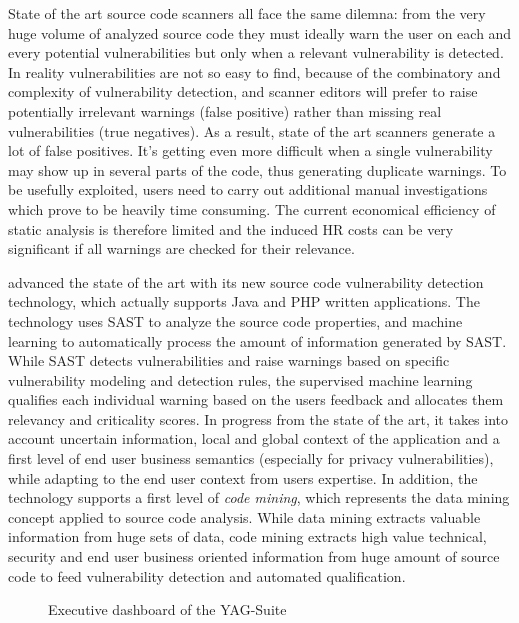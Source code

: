 \documentclass[a4paper,11pt]{article}
\begin{document}
State of the art source code scanners all face the same dilemna: from the very huge volume of analyzed source code they must ideally warn the user on each and every potential vulnerabilities but only when a relevant vulnerability is detected. In reality vulnerabilities are not so easy to find, because of the combinatory and complexity of vulnerability detection, and scanner editors will prefer to raise potentially irrelevant warnings (false positive) rather than missing real vulnerabilities (true negatives). As a result, state of the art scanners generate a lot of false positives. It's getting even more difficult when a single vulnerability may show up in several parts of the code, thus generating duplicate warnings. 
To be usefully exploited, users need to carry out additional manual investigations which prove to be heavily time consuming. The current economical efficiency of static analysis is therefore limited and the induced HR costs can be very significant if all warnings are checked for their relevance.

\YAGshort{} advanced the state of the art with its new source code vulnerability detection technology, which actually supports Java and PHP written applications. The technology uses SAST to analyze the source code properties, and machine learning to automatically process the amount of information generated by SAST. While SAST detects vulnerabilities and raise warnings based on specific vulnerability modeling and detection rules, the supervised machine learning qualifies each individual warning based on the users feedback and allocates them relevancy and criticality scores. In progress from the state of the art, it takes into account uncertain information, local and global context of the application and a first level of end user business semantics (especially for privacy vulnerabilities), while adapting to the end user context from users expertise. In addition, the technology supports a first level of \emph{code mining}, which represents the data mining concept applied to source code analysis. While data mining extracts valuable information from huge sets of data, code mining extracts high value technical, security and end user business oriented information from huge amount of source code to feed vulnerability detection and automated qualification.

\begin{figure}[tp]
  \begin{center}
  \vspace{-5mm}
  \caption{Executive dashboard of the YAG-Suite}
  \label{fig:overview}
  \end{center}
  \end{figure}
\end{document}
